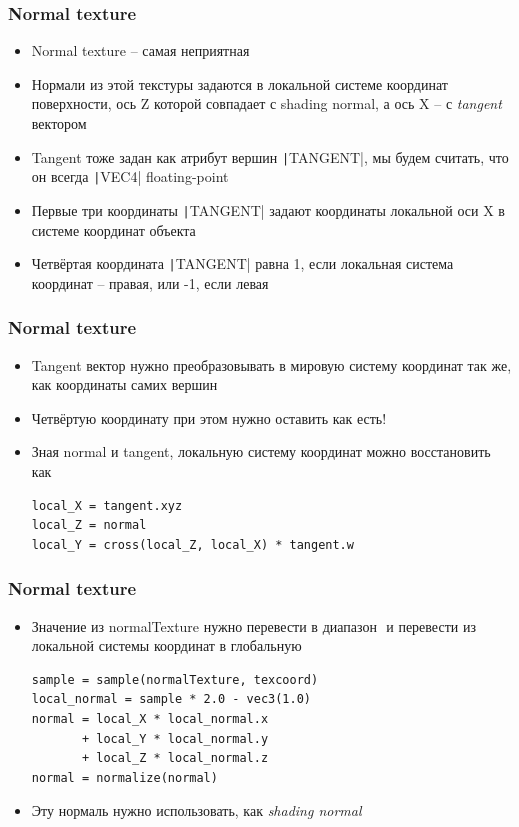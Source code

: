 \documentclass[10pt]{beamer}
\begin{document}
\begin{frame}
\frametitle{Normal texture}
\begin{itemize}
\item Normal texture -- самая неприятная
\pause
\item Нормали из этой текстуры задаются в локальной системе координат поверхности, ось Z которой совпадает с shading normal, а ось X -- с \textit{tangent} вектором
\pause
\item Tangent тоже задан как атрибут вершин \texttt|TANGENT|, мы будем считать, что он всегда \texttt|VEC4| floating-point
\pause
\item Первые три координаты \texttt|TANGENT| задают координаты локальной оси X в системе координат объекта
\pause
\item Четвёртая координата \texttt|TANGENT| равна 1, если локальная система координат -- правая, или -1, если левая
\end{itemize}
\end{frame}

\begin{frame}[fragile]
\frametitle{Normal texture}
\begin{itemize}
\item Tangent вектор нужно преобразовывать в мировую систему координат так же, как координаты самих вершин
\pause
\item Четвёртую координату при этом нужно оставить как есть!
\pause
\item Зная normal и tangent, локальную систему координат можно восстановить как
\begin{verbatim}
local_X = tangent.xyz
local_Z = normal
local_Y = cross(local_Z, local_X) * tangent.w
\end{verbatim}
\end{itemize}
\end{frame}

\begin{frame}[fragile]
\frametitle{Normal texture}
\begin{itemize}
\item Значение из normalTexture нужно перевести в диапазон \begin{math}[-1,1]\end{math} и перевести из локальной системы координат в глобальную
\begin{verbatim}
sample = sample(normalTexture, texcoord)
local_normal = sample * 2.0 - vec3(1.0)
normal = local_X * local_normal.x
       + local_Y * local_normal.y
       + local_Z * local_normal.z
normal = normalize(normal)
\end{verbatim}
\pause
\item Эту нормаль нужно использовать, как \textit{shading normal}
\end{itemize}
\end{frame}
\end{document}
